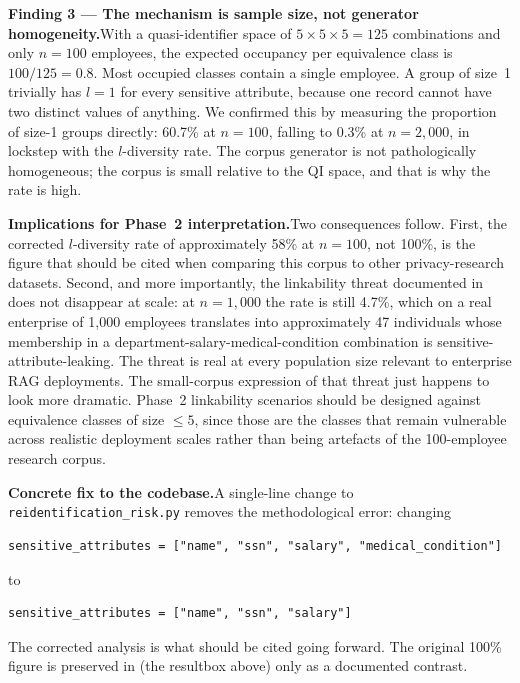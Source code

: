 \documentclass[12pt, a4paper]{article}
\begin{document}
\medskip
\noindent\textbf{Finding 3 --- The mechanism is sample size, not generator homogeneity.}\quad With a quasi-identifier space of $5 \times 5 \times 5 = 125$ combinations and only $n = 100$ employees, the expected occupancy per equivalence class is $100 / 125 = 0.8$. Most occupied classes contain a single employee. A group of size~1 trivially has $l = 1$ for every sensitive attribute, because one record cannot have two distinct values of anything. We confirmed this by measuring the proportion of size-1 groups directly: 60.7\% at $n = 100$, falling to 0.3\% at $n = 2{,}000$, in lockstep with the $l$-diversity rate. The corpus generator is not pathologically homogeneous; the corpus is small relative to the QI space, and that is why the rate is high.

\medskip
\noindent\textbf{Implications for Phase~2 interpretation.}\quad Two consequences follow. First, the corrected $l$-diversity rate of approximately 58\% at $n = 100$, not 100\%, is the figure that should be cited when comparing this corpus to other privacy-research datasets. Second, and more importantly, the linkability threat documented in  does not disappear at scale: at $n = 1{,}000$ the rate is still 4.7\%, which on a real enterprise of 1{,}000 employees translates into approximately 47 individuals whose membership in a department-salary-medical-condition combination is sensitive-attribute-leaking. The threat is real at every population size relevant to enterprise RAG deployments. The small-corpus expression of that threat just happens to look more dramatic. Phase~2 linkability scenarios should be designed against equivalence classes of size $\leq 5$, since those are the classes that remain vulnerable across realistic deployment scales rather than being artefacts of the 100-employee research corpus.

\medskip
\noindent\textbf{Concrete fix to the codebase.}\quad A single-line change to \texttt{reidentification\_risk.py} removes the methodological error: changing
\begin{lstlisting}[style=termstyle]
sensitive_attributes = ["name", "ssn", "salary", "medical_condition"]
\end{lstlisting}
to
\begin{lstlisting}[style=termstyle]
sensitive_attributes = ["name", "ssn", "salary"]
\end{lstlisting}
The corrected analysis is what should be cited going forward. The original 100\% figure is preserved in  (the resultbox above) only as a documented contrast.
\end{document}
